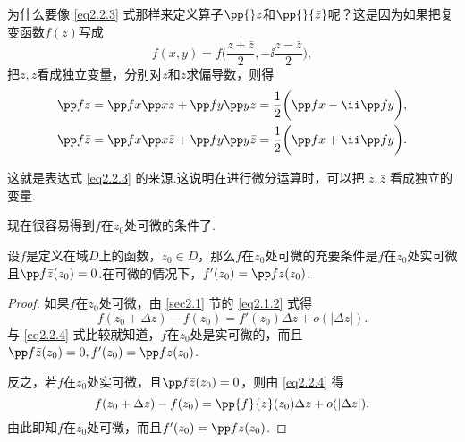 为什么要像 \eqref{eq2.2.3} 式那样来定义算子$\pp{}z$和$\pp{}{\bar z}$呢？这是因为如果把复变函数$f(z)$写成
\[f(x,y)=f\bigg(\frac{z+\bar z}2,-\ii\frac{z-\bar z}2\bigg),\]
把$z,\bar z$看成独立变量，分别对$z$和$\bar z$求偏导数，则得
\begin{gather*}
\pp fz=\pp fx\pp xz+\pp fy\pp yz=\frac12\bigg(\pp fx-\ii\pp fy\bigg),\\
\pp f{\bar z}=\pp fx\pp x{\bar z}+\pp fy\pp y{\bar z}=\frac12\bigg(\pp fx+\ii\pp fy\bigg).
\end{gather*}

这就是表达式 \eqref{eq2.2.3} 的来源.这说明在进行微分运算时，可以把 $z,\bar z$ 看成独立的变量.

现在很容易得到$f$在$z_0$处可微的条件了.
\begin{theorem}\label{thm2.2.3}
设$f$是定义在域$D$上的函数，$z_0\in D$，那么$f$在$z_0$处可微的充要条件是$f$在$z_0$处实可微且$\pp f{\bar z}(z_0)=0$.在可微的情况下，$f'(z_0)=\pp fz(z_0)$.
\end{theorem}
\begin{proof}
如果$f$在$z_0$处可微，由 \ref{sec2.1} 节的 \eqref{eq2.1.2} 式得
\[f(z_0+\Delta z)-f(z_0)=f'(z_0)\Delta z+o(|\Delta z|).\]
与 \eqref{eq2.2.4} 式比较就知道，$f$在$z_0$处是实可微的，而且$\pp f{\bar z}(z_0)=0,f'(z_0)=\pp fz(z_0)$.

反之，若$f$在$z_0$处实可微，且$\pp f{\bar z}(z_0)=0$，则由 \eqref{eq2.2.4} 得
\[f(z_0+\Delta z)-f(z_0)=\pp{f}{z}(z_0)\Delta z+o(|\Delta z|).\]
由此即知$f$在$z_0$处可微，而且$f'(z_0)=\pp fz(z_0)$.
\end{proof}

